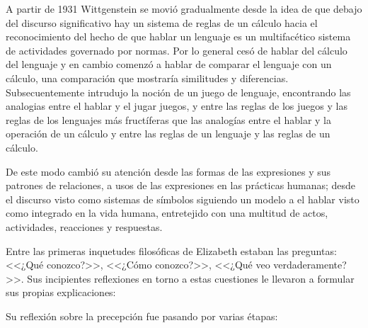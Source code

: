 A partir de 1931 Wittgenstein se movió gradualmente desde la idea de que debajo del
discurso significativo hay un sistema de reglas de un cálculo hacia el reconocimiento
del hecho de que hablar un lenguaje es un multifacético sistema de actividades
governado por normas. Por lo general cesó de hablar del cálculo del lenguaje y en
cambio comenzó a hablar de comparar el lenguaje con un cálculo, una comparación que
mostraría similitudes y diferencias. Subsecuentemente intrudujo la noción de un juego
de lenguaje, encontrando las analogias entre el hablar y el jugar juegos, y entre las
reglas de los juegos y las reglas de los lenguajes más fructíferas que las analogías
entre el hablar y la operación de un cálculo y entre las reglas de un lenguaje y las
reglas de un cálculo.

De este modo cambió su atención desde las formas de las expresiones y sus
patrones de relaciones, a usos de las expresiones en las prácticas humanas;
desde el discurso visto como sistemas de símbolos siguiendo un modelo a el
hablar visto como integrado en la vida humana, entretejido con una multitud de
actos, actividades, reacciones y respuestas.

Entre las primeras inquetudes filosóficas de Elizabeth estaban las preguntas:
<<¿Qué conozco?>>, <<¿Cómo conozco?>>, <<¿Qué veo verdaderamente?>>. Sus
incipientes reflexiones en torno a estas cuestiones le llevaron a formular sus
propias explicaciones:


Su reflexión sobre la precepción fue pasando por varias étapas:

